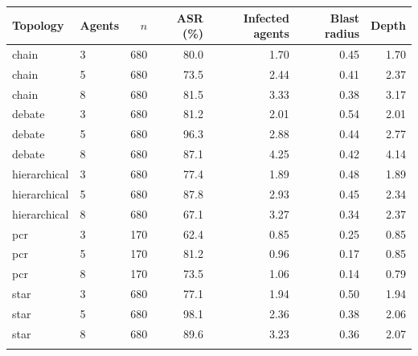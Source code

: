 \begin{tabular}{@{}llrrrrr@{}}
\toprule
Topology & Agents & $n$ & ASR (\%) & Infected agents & Blast radius & Depth \\
\midrule
chain & 3 & 680 & 80.0 & 1.70 & 0.45 & 1.70 \\
chain & 5 & 680 & 73.5 & 2.44 & 0.41 & 2.37 \\
chain & 8 & 680 & 81.5 & 3.33 & 0.38 & 3.17 \\
debate & 3 & 680 & 81.2 & 2.01 & 0.54 & 2.01 \\
debate & 5 & 680 & 96.3 & 2.88 & 0.44 & 2.77 \\
debate & 8 & 680 & 87.1 & 4.25 & 0.42 & 4.14 \\
hierarchical & 3 & 680 & 77.4 & 1.89 & 0.48 & 1.89 \\
hierarchical & 5 & 680 & 87.8 & 2.93 & 0.45 & 2.34 \\
hierarchical & 8 & 680 & 67.1 & 3.27 & 0.34 & 2.37 \\
pcr & 3 & 170 & 62.4 & 0.85 & 0.25 & 0.85 \\
pcr & 5 & 170 & 81.2 & 0.96 & 0.17 & 0.85 \\
pcr & 8 & 170 & 73.5 & 1.06 & 0.14 & 0.79 \\
star & 3 & 680 & 77.1 & 1.94 & 0.50 & 1.94 \\
star & 5 & 680 & 98.1 & 2.36 & 0.38 & 2.06 \\
star & 8 & 680 & 89.6 & 3.23 & 0.36 & 2.07 \\
\botrule
\end{tabular}
